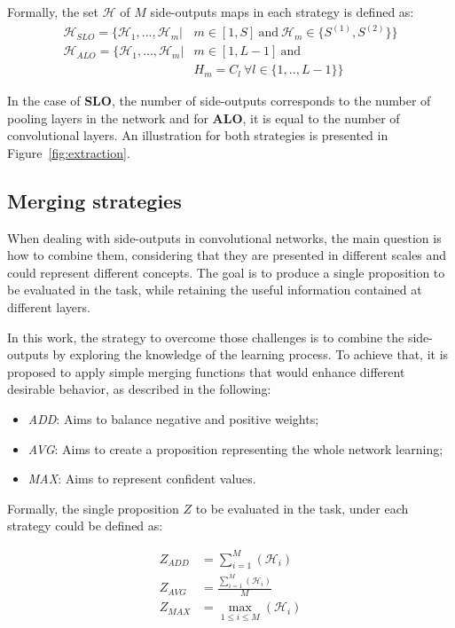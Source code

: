 Formally, the set $\mathcal{H}$ of $M$ side-outputs maps in each strategy is defined as:
\small
\begin{align}
\mathcal{H}_{SLO}=\{\mathcal{H}_1,...,\mathcal{H}_m|& m\in[1,S]~\text{and}~\mathcal{H}_m \in\{S^{(1)},S^{(2)}\}\}\\
\mathcal{H}_{ALO}=\{\mathcal{H}_1,...,\mathcal{H}_m|& m\in[1,L-1]~\text{and}~\nonumber\\&{H}_m=C_l~\forall l \in \{1,..,L-1\}\}
\end{align}
\normalsize

In the case of \textbf{SLO}, the number of side-outputs corresponds to the number of pooling layers in the network and for \textbf{ALO}, it is equal to the number of convolutional layers. An illustration for both strategies is presented in Figure~\ref{fig:extraction}.

\subsection{Merging strategies}
\label{ssec:mergin_strategies}
 

When dealing with side-outputs in convolutional networks, the main question is how to combine them, considering that they are presented in different scales and could represent different concepts. The goal is to produce a single proposition to be evaluated in the task, while retaining the useful information contained at different layers.

In this work, the strategy to overcome those challenges is to combine the side-outputs by exploring the knowledge of the learning process. To achieve that, it is proposed to apply simple merging functions that would enhance different desirable behavior, as described in the following: 
\begin{itemize}
\item \textit{ADD}: Aims to balance negative and positive weights;
\item \textit{AVG}: Aims to create a proposition representing the whole network learning;  
\item \textit{MAX}: Aims to represent confident values. 
\end{itemize}  

Formally, the single proposition $Z$ to be evaluated in the task, under each strategy could be defined as:

\begin{align}
Z_{ADD} &= \sum_{i=1}^{M}(\mathcal{H}_i)\\
Z_{AVG} &= \frac{\sum_{i=1}^{M}(\mathcal{H}_i)}{M}\\
Z_{MAX} &= \max_{1 \leq i \leq M} (\mathcal{H}_i)
\end{align} 

